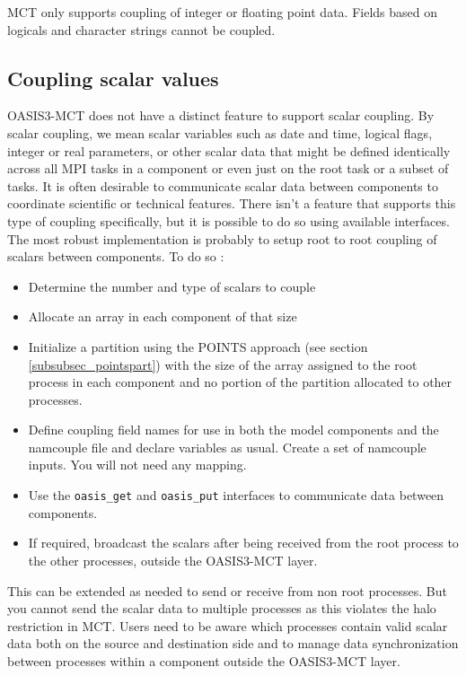 MCT only supports coupling of integer or floating point data.  Fields based on
logicals and character strings cannot be coupled.

\subsection{Coupling scalar values}
\label{subsec_scalar}

OASIS3-MCT does not have a distinct feature to support scalar coupling.  By
scalar coupling, we mean  scalar variables such as date and time,
logical flags, integer or real parameters, or other scalar data that might be
defined identically across all MPI tasks in a component or even just on the
root task or a subset of tasks.  
It is often desirable to communicate scalar data between components
to coordinate scientific or technical features.  There isn't a feature that
supports this type of coupling specifically, but it is possible to do so using  
available interfaces.  The most robust implementation is probably to setup
root to root coupling of scalars between components.  To do so :

\begin{itemize}
\item Determine the number and type of scalars to couple
\item Allocate an array in each component of that size
\item Initialize a partition using the POINTS approach (see section \ref{subsubsec_pointspart}) with the size of the array assigned to the root process in each component and no portion of the partition allocated to other processes.  
\item Define coupling field names for use in both the model components and the namcouple file and declare variables as usual.  Create a set of namcouple inputs.  You will not need any mapping.
\item Use the {\tt oasis\_get} and {\tt oasis\_put} interfaces to communicate data between components.
\item If required, broadcast the scalars after being received from the root process to the other processes, outside the OASIS3-MCT layer.
\end{itemize}

This can be extended as needed to send or receive from non root processes.  But
you cannot send the scalar data to multiple processes as this violates the halo
restriction in MCT.  Users need to be aware which processes contain valid scalar
data both on the source and destination side and to manage data synchronization 
between processes within a component outside the OASIS3-MCT layer.

